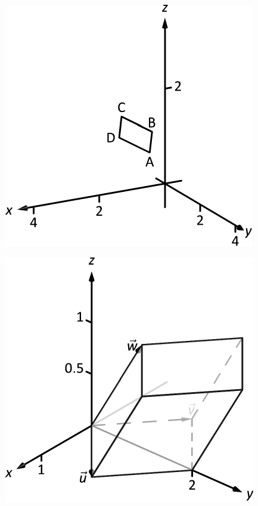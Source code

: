 \documentclass[10pt]{article}
\begin{document}
\includegraphics{figcrossp4a_3DBW.pdf}
\texttt{}

\includegraphics{figcrossp6_3DBW.pdf}
\texttt{}
\end{document}
